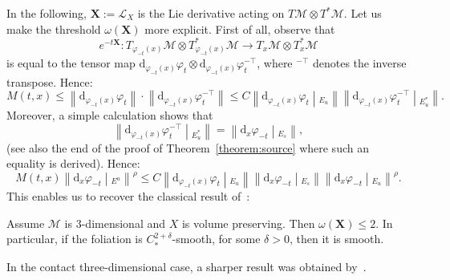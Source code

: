 \documentclass[AHL,Unicode,longabstracts,published]{cedram}
\newcommand{\X}{\mathbf{X}}
\newcommand{\mc}{\mathcal}
\newcommand{\M}{\mathcal{M}}
\newcommand{\dd}{\mathrm{d}}
\begin{document}
In the following, $\X := \mc{L}_X$ is the Lie derivative acting on $T\M \otimes T^*\M$. Let us make the threshold $\omega(\X)$ more explicit. First of all, observe that
\[
e^{-t \X} : T_{\varphi_{-t}(x)}\M \otimes T^*_{\varphi_{-t}(x)}\M \rightarrow T_{x}\M \otimes T^*_{x}\M
\]
is equal to the tensor map $\dd_{\varphi_{-t}(x)} \varphi_t \otimes \dd_{\varphi_{-t}(x)} \varphi_t^{-\top}$, where ${}^{-\top}$ denotes the inverse transpose. Hence:
\[
M(t,x) \leq \left\|\dd_{\varphi_{-t}(x)} \varphi_t\right\|\cdot\left\|\dd_{\varphi_{-t}(x)} \varphi_t^{-\top}\right\| \leq C \left\|\dd_{\varphi_{-t}(x)} \varphi_t\middle|_{E_u}\right\| \left\|\dd_{\varphi_{-t}(x)} \varphi_t^{-\top}\middle|_{E_u^*}\right\|.
\]
Moreover, a simple calculation shows that
\[
\left\|\dd_{\varphi_{-t}(x)} \varphi_t^{-\top}\middle|_{E_u^*}\right\| = \left\|\dd_x \varphi_{-t}\middle|_{E_s}\right\|,
\]
(see also the end of the proof of Theorem~\ref{theorem:source} where such an equality is derived). Hence:
\begin{equation}\label{equation:cal}
M(t,x) \left\|\dd_x \varphi_{-t}\middle|_{E^u}\right\|^\rho \leq C \left\|\dd_{\varphi_{-t}(x)} \varphi_t\middle|_{E_u}\right\| \left\|\dd_x \varphi_{-t}\middle|_{E_s}\right\| \left\|\dd_x \varphi_{-t}\middle|_{E_u}\right\|^\rho.
\end{equation}
This enables us to recover the classical result of~\cite{Hasselblatt-92}:

\begin{theo}\label{theo4.10}
Assume $\M$ is $3$-dimensional and $X$ is volume preserving. Then $\omega(\X)\leq 2$. In particular, if the foliation is $C^{2+\delta}_*$-smooth, for some $\delta > 0$, then it is smooth.
\end{theo}

In the contact three-dimensional case, a sharper result was obtained by~\cite{Hurder-Katok-90}.
\end{document}

